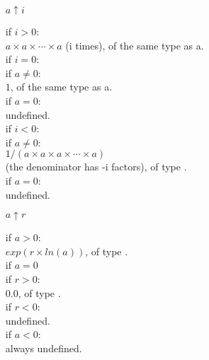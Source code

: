 \documentclass[a4paper,11pt]{article}
\begin{document}
\begin{enumerate}
\item[$a \uparrow i$]
  \begin{flushleft}
    if $i > 0$:\\
    \hspace{1.0cm}$a \times a \times \cdots \times a$ (i times), of the same type as a.\\

    if $i = 0$:\\

    \hspace{1.0cm}if $a \neq 0$:\\
    \hspace{2.0cm}$1$, of the same type as a.\\

    \hspace{1.0cm}if $a = 0$:\\
    \hspace{2.0cm}undefined.\\

    if $i < 0$:\\

    \hspace{1.0cm}if $a \neq 0$:\\
    \hspace{2.0cm}$1/(a \times a \times a \times \cdots \times a)$\\
    \hspace{2.0cm}(the denominator has -i factors), of type .\\

    \hspace{1.0cm}if $a = 0$:\\
    \hspace{2.0cm}undefined.\\
  \end{flushleft}

\item[$a \uparrow r$]

  \begin{flushleft}
    if $a > 0$:\\
    \hspace{1.0cm}$exp(r \times ln(a))$, of type .\\

    if $a = 0$\\
    \hspace{1.0cm}if $r > 0$:\\
    \hspace{2.0cm}$0.0$, of type .\\
    \hspace{1.0cm}if $r < 0$:\\
    \hspace{2.0cm}undefined.\\

    if $a < 0$:\\
    \hspace{1.0cm}always undefined.\\
  \end{flushleft}

\end{enumerate}
\end{document}
